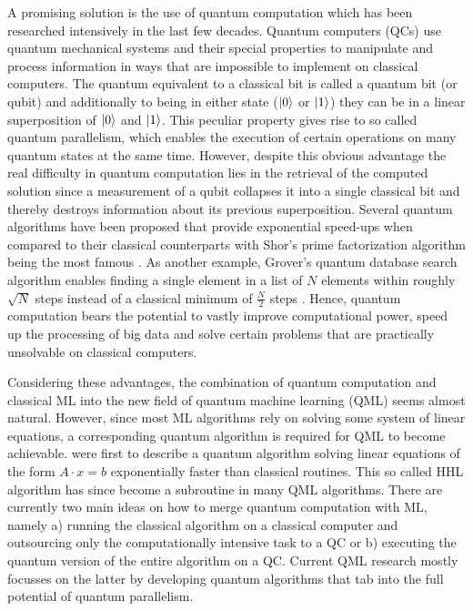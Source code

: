 \documentclass[a4paper]{article}
\newcommand*{\0}{$\ket{0}$}
\newcommand*{\1}{$\ket{1}$}
\begin{document}
A promising solution is the use of quantum computation which has been researched intensively in the last few decades. Quantum computers (QCs) use quantum mechanical systems and their special properties to manipulate and process information in ways that are impossible to implement on classical computers. The quantum equivalent to a classical bit is called a quantum bit (or qubit) and additionally to being in either state (\0 or \1) they can be in a linear superposition of \0 and \1. This peculiar property gives rise to so called quantum parallelism, which enables the execution of certain operations on many quantum states at the same time. However, despite this obvious advantage the real difficulty in quantum computation lies in the retrieval of the computed solution since a measurement of a qubit collapses it into a single classical bit and thereby destroys information about its previous superposition. Several quantum algorithms have been proposed that provide exponential speed-ups when compared to their classical counterparts with Shor's prime factorization algorithm being the most famous \citep{shor1994}. As another example, Grover's quantum database search algorithm enables finding a single element in a list of $N$ elements within roughly $\sqrt{N}$ steps instead of a classical minimum of $\frac{N}{2}$ steps \citep{grover}. Hence, quantum computation bears the potential to vastly improve computational power, speed up the processing of big data and solve certain problems that are practically unsolvable on classical computers. 


Considering these advantages, the combination of quantum computation and classical ML into the new field of quantum machine learning (QML) seems almost natural. However, since most ML algorithms rely on solving some system of linear equations, a corresponding quantum algorithm is required for QML to become achievable. \cite{HHL2009} were first to describe a quantum algorithm solving linear equations of the form $A \cdot x = b$ exponentially faster than classical routines. This so called HHL algorithm has since become a subroutine in many QML algorithms. There are currently two main ideas on how to merge quantum computation with ML, namely a) running the classical algorithm on a classical computer and outsourcing only the computationally intensive task to a QC or b) executing the quantum version of the entire algorithm on a QC. Current QML research mostly focusses on the latter by developing quantum algorithms that tab into the full potential of quantum parallelism.
\end{document}
